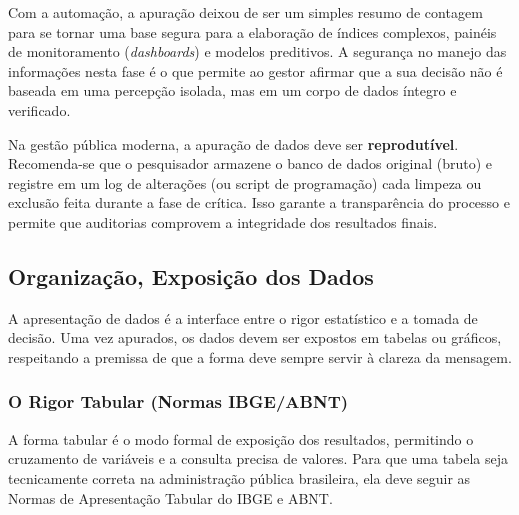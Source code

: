 Com a automação, a apuração deixou de ser um simples resumo de contagem para se tornar uma base segura para a elaboração de índices complexos, painéis de monitoramento (\textit{dashboards}) e modelos preditivos. A segurança no manejo das informações nesta fase é o que permite ao gestor afirmar que a sua decisão não é baseada em uma percepção isolada, mas em um corpo de dados íntegro e verificado.


\begin{tcolorbox}[colback=green!5,colframe=green!40!black,title= Dica Técnica: Reprodutibilidade e Transparência]
Na gestão pública moderna, a apuração de dados deve ser \textbf{reprodutível}. Recomenda-se que o pesquisador armazene o banco de dados original (bruto) e registre em um log de alterações (ou script de programação) cada limpeza ou exclusão feita durante a fase de crítica. Isso garante a transparência do processo e permite que auditorias comprovem a integridade dos resultados finais.
\end{tcolorbox}




\subsection{Organização, Exposição dos Dados}

A apresentação de dados é a interface entre o rigor estatístico e a tomada de decisão. Uma vez apurados, os dados devem ser expostos em tabelas ou gráficos, respeitando a premissa de que a forma deve sempre servir à clareza da mensagem.

\subsubsection{O Rigor Tabular (Normas IBGE/ABNT)}

A forma tabular é o modo formal de exposição dos resultados, permitindo o cruzamento de variáveis e a consulta precisa de valores. Para que uma tabela seja tecnicamente correta na administração pública brasileira, ela deve seguir as Normas de Apresentação Tabular do IBGE e ABNT.



